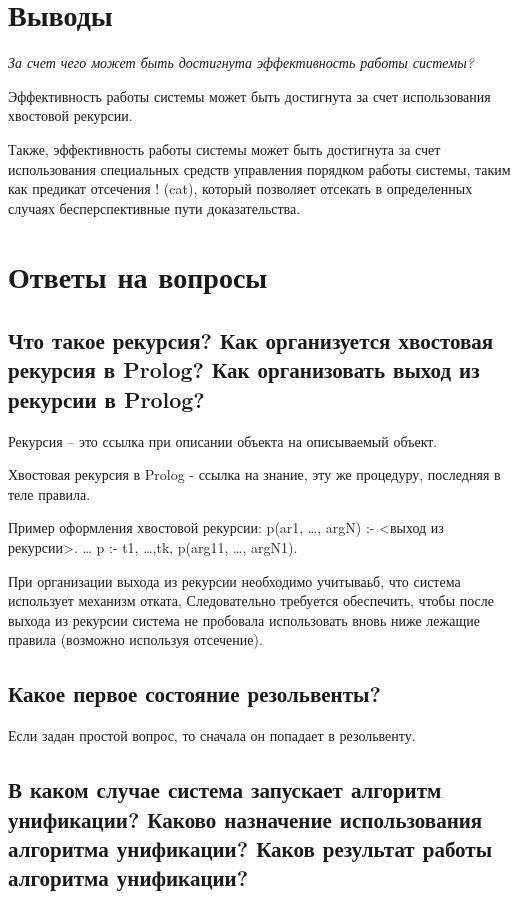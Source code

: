 \documentclass[a4paper,12pt]{article}
\begin{document}
	\section*{Выводы}
	
	\textit{За счет чего может быть достигнута эффективность работы системы?}
	
	Эффективность работы системы может быть достигнута за счет использования хвостовой рекурсии.
	
	Также, эффективность работы системы может быть достигнута за счет использования специальных средств управления порядком работы системы, таким как предикат отсечения ! (cat), который позволяет отсекать в определенных случаях бесперспективные пути доказательства.
	
	\newpage
	
	\section*{Ответы на вопросы}
	
	\subsection*{Что такое рекурсия? Как организуется хвостовая рекурсия в Prolog? Как организовать выход из рекурсии в Prolog?}
	
	Рекурсия – это ссылка при описании объекта на описываемый объект.
	
	Хвостовая рекурсия в Prolog - ссылка на знание, эту же процедуру, 
	последняя в теле правила.
	
	Пример оформления хвостовой рекурсии:
	p(ar1, …, argN) :-  <выход из рекурсии>.
	…
	p :- t1, …,tk, p(arg11, …, argN1).
	
	При организации выхода из рекурсии необходимо учитываьб, что система использует механизм отката, Следовательно требуется обеспечить, чтобы после выхода из рекурсии система не пробовала использовать вновь ниже лежащие правила (возможно используя отсечение).
	
	\subsection*{Какое первое состояние резольвенты?}
	
	Если задан простой вопрос, то сначала он попадает в резольвенту.
	
	\subsection*{В каком случае система запускает алгоритм унификации? Каково назначение использования алгоритма унификации? Каков результат работы алгоритма унификации? }
	
\end{document}
